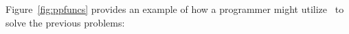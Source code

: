 \documentclass[article,screen,12pt, nonacm]{acmart}
\begin{document}



    
      

    
  Figure~\ref{fig:ppfuncs} provides an example of how a programmer might utilize
  \PPlus\ to solve the previous problems: 
\end{document}
